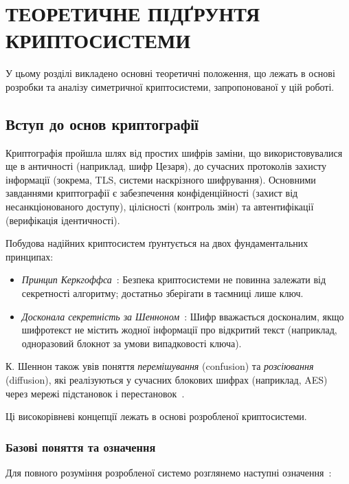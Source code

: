 \chapter{ТЕОРЕТИЧНЕ ПІДҐРУНТЯ КРИПТОСИСТЕМИ}\label{ch:-1:---}

У цьому розділі викладено основні теоретичні положення, що лежать в основі розробки та аналізу симетричної криптосистеми, запропонованої у цій роботі.


\section{Вступ до основ криптографії}
\label{sec:crypto_intro}

Криптографія пройшла шлях від простих шифрів заміни, що використовувалися ще в античності (наприклад, шифр Цезаря),
до сучасних протоколів захисту інформації (зокрема, TLS, системи наскрізного шифрування).
Основними завданнями криптографії є забезпечення конфіденційності (захист від несанкціонованого доступу),
цілісності (контроль змін) та автентифікації (верифікація ідентичності).

Побудова надійних криптосистем ґрунтується на двох фундаментальних принципах:
\begin{itemize}
    \item \emph{Принцип Керкгоффса}~\cite{9}: Безпека криптосистеми не повинна залежати від секретності алгоритму;
    достатньо зберігати в таємниці лише ключ.
    \item \emph{Досконала секретність за Шенноном}~\cite{8}: Шифр вважається досконалим, якщо шифротекст не містить жодної
    інформації про відкритий текст (наприклад, одноразовий блокнот за умови випадковості ключа).
\end{itemize}

К. Шеннон також увів поняття \emph{перемішування} (confusion) та \emph{розсіювання} (diffusion), які реалізуються у сучасних
блокових шифрах (наприклад, AES) через мережі підстановок і перестановок~\cite{8}.

Ці високорівневі концепції лежать в основі розробленої криптосистеми.

\subsection{Базові поняття та означення}
\label{subsec:crypto_basics}

Для повного розуміння розробленої системо розглянемо наступні означення~\cite{1,4}:

